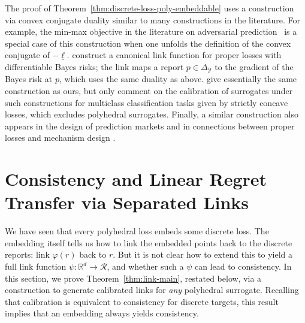 \documentclass[twoside,11pt]{article}
\newcommand{\Comments}{1}
\newcommand{\mynote}[2]{\ifnum\Comments=1\textcolor{#1}{#2}\fi}
\newcommand{\mytodo}[2]{\ifnum\Comments=1%
  \todo[linecolor=#1!80!black,backgroundcolor=#1,bordercolor=#1!80!black]{#2}\fi}
\newcommand{\raf}[1]{\mynote{darkgreen}{[RF: #1]}}
\newcommand{\raft}[1]{\mytodo{green!20!white}{RF: #1}}
\newcommand{\jessie}[1]{\mynote{teal}{[JF: #1]}}
\newcommand{\reals}{\mathbb{R}}
\newcommand{\simplex}{\Delta_\Y}
\newcommand{\R}{\mathcal{R}}
\newcommand{\Y}{\mathcal{Y}}
\newcommand{\risk}[1]{\underline{#1}}
\begin{document}
The proof of Theorem~\ref{thm:discrete-loss-poly-embeddable} uses a construction via convex conjugate duality similar to many constructions in the literature. 
For example, the min-max objective in the literature on adversarial prediction~\citep{asif2015adversarial,farnia2016minimax,fathony2016adversarial,fathony2018consistent} is a special case of this construction when one unfolds the definition of the convex conjugate of $-\risk \ell$.
\citet{reid2012convexity} construct a canonical link function for proper losses with differentiable Bayes risks; the link maps a report $p\in\simplex$ to the gradient of the Bayes risk at $p$, which uses the same duality as above.
\citet[Proposition 3]{duchi2018multiclass} give essentially the same construction as ours, but only comment on the calibration of surrogates under such constructions for multiclass classification tasks given by strictly concave losses, which excludes polyhedral surrogates.
Finally, a similar construction also appears in the design of prediction markets \citep{abernethy2013efficient} and in connections between proper losses and mechanism design \citep{frongillo2014general,frongillo2021general}.


\section{Consistency and Linear Regret Transfer via Separated Links}
\label{sec:calibration}

We have seen that every polyhedral loss embeds some discrete loss.
The embedding itself tells us how to link the embedded points back to the discrete reports: link $\varphi(r)$ back to $r$.
But it is not clear how to extend this to yield a full link function $\psi: \reals^d \to \R$, and whether such a $\psi$ can lead to consistency.
In this section, we prove Theorem~\ref{thm:link-main}, restated below, via a construction to generate calibrated links for \emph{any} polyhedral surrogate.
Recalling that calibration is equivalent to consistency for discrete targets, this result implies that an embedding always yields consistency.
\end{document}

